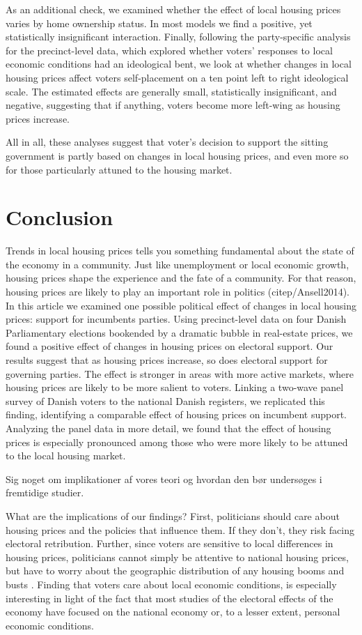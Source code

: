 \documentclass[12pt,a4paper]{article}
\begin{document}
	As an additional check, we examined whether the effect of local housing prices varies by home ownership status. In most models we find a positive, yet statistically insignificant interaction. Finally, following the party-specific analysis for the precinct-level data, which explored whether voters’ responses to local economic conditions had an ideological bent, we look at whether changes in local housing prices affect voters self-placement on a ten point left to right ideological scale. The estimated effects are generally small, statistically insignificant, and negative, suggesting that if anything, voters become more left-wing as housing prices increase.
	
	All in all, these analyses suggest that voter’s decision to support the sitting government is partly based on changes in local housing prices, and even more so for those particularly attuned to the housing market.
	
	\section{Conclusion}
	Trends in local housing prices tells you something fundamental about the state of the economy in a community. Just like unemployment or local economic growth, housing prices shape the experience and the fate of a community. For that reason, housing prices are likely to play an important role in politics (citep/Ansell2014). In this article we examined one possible political effect of changes in local housing prices: support for incumbents parties. Using precinct-level data on four Danish Parliamentary elections bookended by a dramatic bubble in real-estate prices, we found a positive effect of changes in housing prices on electoral support. Our results suggest that as housing prices increase, so does electoral support for governing parties. The effect is stronger in areas with more active markets, where housing prices are likely to be more salient to voters. Linking a two-wave panel survey of Danish voters to the national Danish registers, we replicated this finding, identifying a comparable effect of housing prices on incumbent support. Analyzing the panel data in more detail, we found that the effect of housing prices is especially pronounced among those who were more likely to be attuned to the local housing market. 
	
	
	Sig noget om implikationer af vores teori og hvordan den bør undersøges i fremtidige studier.
	
	What are the implications of our findings? First, politicians should care about housing prices and the policies that influence them. If they don’t, they risk facing electoral retribution. Further, since voters are sensitive to  local differences in housing prices, politicians cannot simply be attentive to national housing prices, but have to worry about the geographic distribution of any housing booms and busts \citep[cf.][11]{ferejohn1986incumbent}. Finding that voters care about local economic conditions, is especially interesting in light of the fact that most studies of the electoral effects of the economy have focused on the national economy or, to a lesser extent, personal economic conditions.
	
\end{document}
